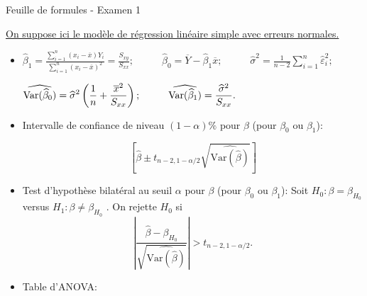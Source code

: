 \documentclass[a4paper, 11pt]{article}
\begin{document}
\begin{center}
{\Large Feuille de formules - Examen 1}
\end{center}


\underline{On suppose ici le modèle de régression linéaire simple avec erreurs normales.}

\begin{itemize}
\item[$\bullet$]

$ \displaystyle
\widehat{\beta}_1 = \frac{\displaystyle \sum_{i=1}^n (x_i - \overline{x}) Y_i }{\displaystyle \sum_{i=1}^n (x_i - \overline{x})^2} = \frac{S_{xy}}{S_{xx}}; \; \; \; \; \; \; \; \; \; \;
 \widehat{\beta}_0 = \overline{Y} - \widehat{\beta}_1\overline{x}; 
 \; \; \; \; \; \; \; \; \; \;
  \widehat{\sigma}^2 = \frac{1}{n-2}\sum_{i=1}^n \widehat{\varepsilon}_i^2;
 $


$ \displaystyle \widehat{\mbox{Var}(\widehat{\beta}_0)} = \widehat{\sigma}^2 \left( {1\over n}+{\overline{x}^2\over S_{xx}} \right);   
\; \; \; \; \; \; \; \; \; \; \widehat{\mbox{Var}(\widehat{\beta}_1)} = \frac{\widehat{\sigma}^2}{S_{xx}}. $


\item[$\bullet$] Intervalle de confiance de niveau $(1-\alpha)\%$ pour $\beta$ (pour $\beta_0$ ou $\beta_1$):


$$\left[\widehat{\beta} \pm t_{n-2, 1-\alpha/2} \sqrt{\widehat{\mbox{Var}(\widehat{\beta})}} \right] $$

\item[$\bullet$]
Test d'hypothèse bilatéral au seuil $\alpha$ pour $\beta$ (pour $\beta_0$ ou $\beta_1$): Soit $H_0 : \beta = \beta_{H_0}$ versus $H_1 : \beta \neq \beta_{H_0}$ . 
On rejette $H_0$ si $$ \left| \frac{\widehat{\beta} - \beta_{H_0} }{\sqrt{\widehat{\mbox{Var}(\widehat{\beta})}}} \right| > t_{n-2, 1- \alpha/2}.$$

\item[$\bullet$]
Table d'ANOVA:


\end{itemize}
\end{document}

